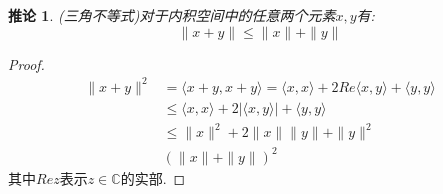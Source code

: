\documentclass[a4paper,11pt]{article}
\newtheorem{proof}{证明}[section]
\newtheorem{corollary}{推论}[section]
\begin{document}
\begin{corollary}
  (三角不等式)对于内积空间中的任意两个元素$x,y$有:
  \begin{equation*}
    \|x+y\|\leq\|x\|+\|y\|
  \end{equation*}
\end{corollary}
\begin{proof}
  \begin{equation*}
  \begin{split}
     \|x+y\|^2& =\langle x+y,x+y\rangle=\langle x,x\rangle+2Re\langle x,y\rangle+\langle y,y\rangle \\
       & \leq\langle x,x\rangle+2|\langle x,y\rangle|+\langle y,y\rangle \\
       & \leq\|x\|^2+2\|x\|\|y\|+\|y\|^2 \\
       & (\|x\|+\|y\|)^2
  \end{split}
  \end{equation*}
  其中$Re z$表示$z\in \mathbb{C}$的实部.
\end{proof}
\end{document}
